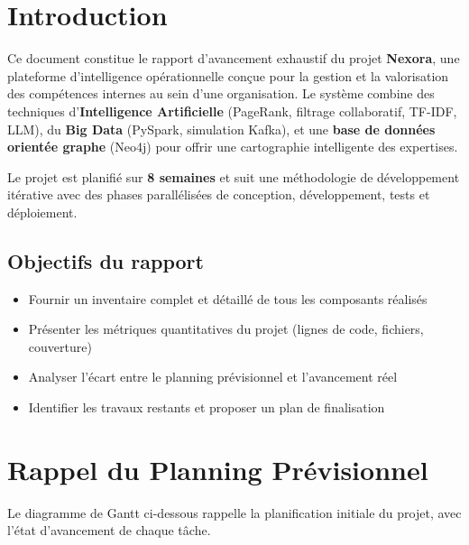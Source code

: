\documentclass[12pt,a4paper]{article}
\begin{document}
\section{Introduction}

Ce document constitue le rapport d'avancement exhaustif du projet \textbf{Nexora}, une plateforme d'intelligence opérationnelle conçue pour la gestion et la valorisation des compétences internes au sein d'une organisation. Le système combine des techniques d'\textbf{Intelligence Artificielle} (PageRank, filtrage collaboratif, TF-IDF, LLM), du \textbf{Big Data} (PySpark, simulation Kafka), et une \textbf{base de données orientée graphe} (Neo4j) pour offrir une cartographie intelligente des expertises.

Le projet est planifié sur \textbf{8 semaines} et suit une méthodologie de développement itérative avec des phases parallélisées de conception, développement, tests et déploiement.

\subsection{Objectifs du rapport}
\begin{itemize}[leftmargin=*]
    \item Fournir un inventaire complet et détaillé de tous les composants réalisés
    \item Présenter les métriques quantitatives du projet (lignes de code, fichiers, couverture)
    \item Analyser l'écart entre le planning prévisionnel et l'avancement réel
    \item Identifier les travaux restants et proposer un plan de finalisation
\end{itemize}

\section{Rappel du Planning Prévisionnel}

Le diagramme de Gantt ci-dessous rappelle la planification initiale du projet, avec l'état d'avancement de chaque tâche.
\end{document}
